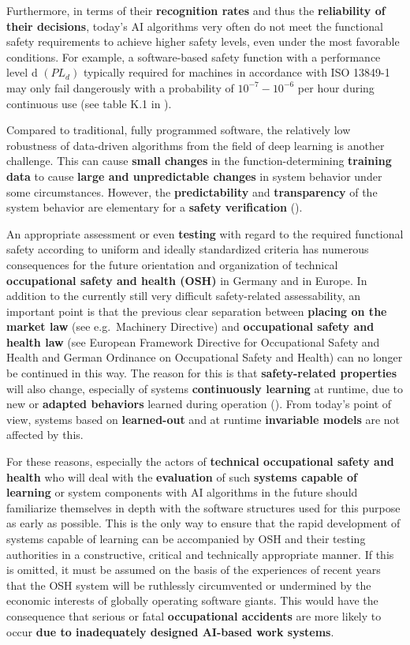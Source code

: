 \documentclass [oneside,10pt,a4paper,ngerman,BCOR10mm,headsepline,parindent,final]{scrartcl}
\begin{document}
Furthermore, in terms of their \textbf{recognition rates} and thus the
\textbf{reliability of their decisions}, today's AI algorithms very
often do not meet the functional safety requirements to achieve higher
safety levels, even under the most favorable conditions. For example, a
software-based safety function with a performance level d \((PL_{d})\)
typically required for machines in accordance with ISO 13849-1 may only
fail dangerously with a probability of \(10^{-7} - 10^{-6}\) per hour
during continuous use (see table K.1 in \cite{DIN_EN_ISO_13849-1_2016}).

Compared to traditional, fully programmed software, the relatively low
robustness of data-driven algorithms from the field of deep learning is
another challenge. This can cause \textbf{small changes} in the
function-determining \textbf{training data} to cause \textbf{large and
unpredictable changes} in system behavior under some circumstances.
However, the \textbf{predictability} and \textbf{transparency} of the
system behavior are elementary for a \textbf{safety verification}
(\cite{BAuA_Rechtsgutachten_KI_2021}).

An appropriate assessment or even \textbf{testing} with regard to the
required functional safety according to uniform and ideally standardized
criteria has numerous consequences for the future orientation and
organization of technical \textbf{occupational safety and health (OSH)}
in Germany and in Europe. In addition to the currently still very
difficult safety-related assessability, an important point is that the
previous clear separation between \textbf{placing on the market law}
(see e.g.~Machinery Directive) and \textbf{occupational safety and
health law} (see European Framework Directive for Occupational Safety
and Health and German Ordinance on Occupational Safety and Health) can
no longer be continued in this way. The reason for this is that
\textbf{safety-related properties} will also change, especially of
systems \textbf{continuously learning} at runtime, due to new or
\textbf{adapted behaviors} learned during operation
(\cite{BAuA_Rechtsgutachten_KI_2021}). From today's point of view,
systems based on \textbf{learned-out} and at runtime \textbf{invariable
models} are not affected by this.

For these reasons, especially the actors of \textbf{technical
occupational safety and health} who will deal with the
\textbf{evaluation} of such \textbf{systems capable of learning} or
system components with AI algorithms in the future should familiarize
themselves in depth with the software structures used for this purpose
as early as possible. This is the only way to ensure that the rapid
development of systems capable of learning can be accompanied by OSH and
their testing authorities in a constructive, critical and technically
appropriate manner. If this is omitted, it must be assumed on the basis
of the experiences of recent years that the OSH system will be
ruthlessly circumvented or undermined by the economic interests of
globally operating software giants. This would have the consequence that
serious or fatal \textbf{occupational accidents} are more likely to
occur \textbf{due to inadequately designed AI-based work systems}.
\end{document}
